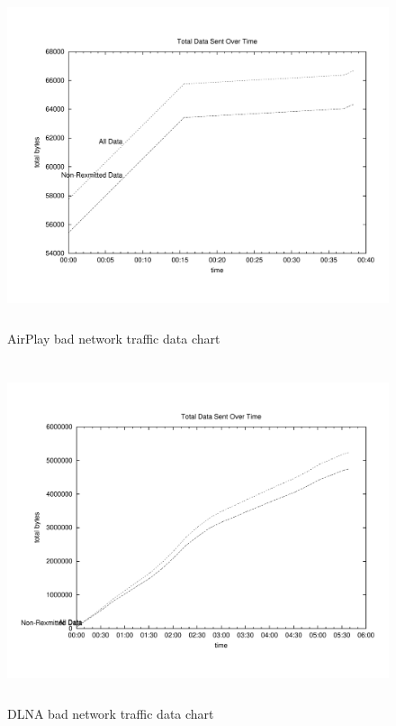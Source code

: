\begin{figure}[htb]
\centering \includegraphics[height=10cm]{charts/badnetwork_AirPlay_traffic_data}
\caption{AirPlay bad network traffic data chart \label{chart6}}
\end{figure}
\begin{figure}[htb]
\centering \includegraphics[height=10cm]{charts/badnetwork_dlna_traffic_data}
\caption{DLNA bad network traffic data chart \label{chart6}}
\end{figure}


